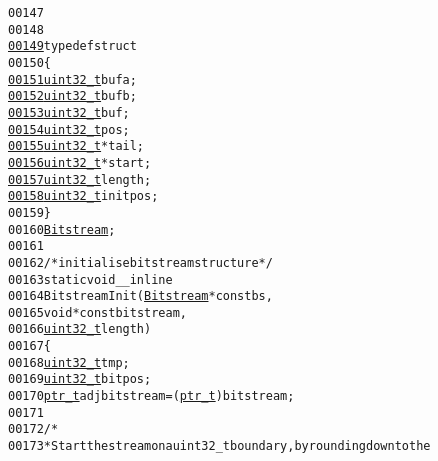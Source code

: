 \begin{footnotesize}
\begin{alltt}
00147 \textcolor{preprocessor}{}
00148 
\hypertarget{_bitstream_8h_source_l00149}{}\hyperlink{struct_bitstream}{00149} \textcolor{keyword}{typedef} \textcolor{keyword}{struct}
00150 \{
\hypertarget{_bitstream_8h_source_l00151}{}\hyperlink{struct_bitstream_a2b3b7e703efb5f16a9b122862f6342ff}{00151}     \hyperlink{_types_8h_a04909d1366bb244ff2482beb51635f37}{uint32_t} bufa;
\hypertarget{_bitstream_8h_source_l00152}{}\hyperlink{struct_bitstream_af88938159f6b589af03d736e9fe8119e}{00152}     \hyperlink{_types_8h_a04909d1366bb244ff2482beb51635f37}{uint32_t} bufb;
\hypertarget{_bitstream_8h_source_l00153}{}\hyperlink{struct_bitstream_aa6e7d5fa7c3bcfaac4cda5c4b07f8aa1}{00153}     \hyperlink{_types_8h_a04909d1366bb244ff2482beb51635f37}{uint32_t} buf;
\hypertarget{_bitstream_8h_source_l00154}{}\hyperlink{struct_bitstream_ac7479c4c4e57d10bbfdd90baf6e731a4}{00154}     \hyperlink{_types_8h_a04909d1366bb244ff2482beb51635f37}{uint32_t} pos;
\hypertarget{_bitstream_8h_source_l00155}{}\hyperlink{struct_bitstream_addd740548c260796cf01e55597f749c6}{00155}     \hyperlink{_types_8h_a04909d1366bb244ff2482beb51635f37}{uint32_t} *tail;
\hypertarget{_bitstream_8h_source_l00156}{}\hyperlink{struct_bitstream_a4c2cb09a4fee7ed90d05f8b40914911e}{00156}     \hyperlink{_types_8h_a04909d1366bb244ff2482beb51635f37}{uint32_t} *start;
\hypertarget{_bitstream_8h_source_l00157}{}\hyperlink{struct_bitstream_a56ea589bea2ad26a4512ff556b055fd8}{00157}     \hyperlink{_types_8h_a04909d1366bb244ff2482beb51635f37}{uint32_t} length;
\hypertarget{_bitstream_8h_source_l00158}{}\hyperlink{struct_bitstream_a3234ef24b4ec8a9d06731d4f2db67418}{00158}     \hyperlink{_types_8h_a04909d1366bb244ff2482beb51635f37}{uint32_t} initpos;
00159 \}
00160 \hyperlink{struct_bitstream}{Bitstream};
00161 
00162 \textcolor{comment}{/* initialise bitstream structure */}
00163 \textcolor{keyword}{static} \textcolor{keywordtype}{void} \_\_inline
00164 BitstreamInit(\hyperlink{struct_bitstream}{Bitstream} * \textcolor{keyword}{const} bs,
00165                           \textcolor{keywordtype}{void} *\textcolor{keyword}{const} bitstream,
00166                           \hyperlink{_types_8h_a04909d1366bb244ff2482beb51635f37}{uint32_t} length)
00167 \{
00168         \hyperlink{_types_8h_a04909d1366bb244ff2482beb51635f37}{uint32_t} tmp;
00169         \hyperlink{_types_8h_a04909d1366bb244ff2482beb51635f37}{uint32_t} bitpos;
00170         \hyperlink{_types_8h_a9c9021e43aafc3d7fd2068cd742bad2c}{ptr_t} adjbitstream = (\hyperlink{_types_8h_a9c9021e43aafc3d7fd2068cd742bad2c}{ptr_t})bitstream;
00171 
00172         \textcolor{comment}{/*}
00173 \textcolor{comment}{         * Start the stream on a uint32\_t boundary, by rounding down to the}

\end{alltt}
\end{footnotesize}

